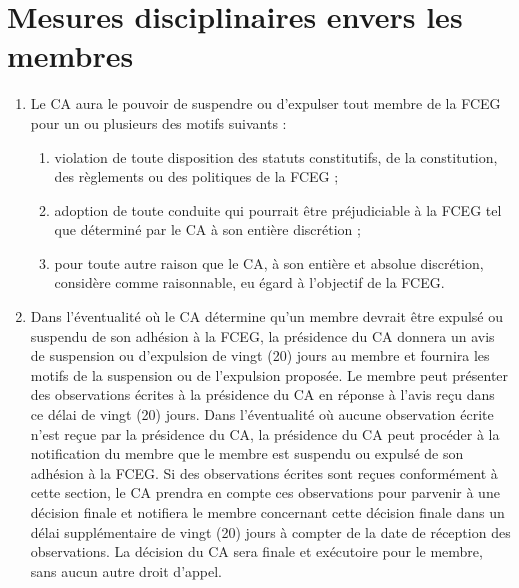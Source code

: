 \section{Mesures disciplinaires envers les membres}
\label{mesures-disciplinaires-envers-les-membres}

\begin{enumerate}
 \item Le CA aura le pouvoir de suspendre ou d'expulser tout membre de la FCEG pour un ou plusieurs des motifs suivants :
  \begin{enumerate}
   \item violation de toute disposition des statuts constitutifs, de la constitution, des règlements ou des politiques de la FCEG ;
   \item adoption de toute conduite qui pourrait être préjudiciable à la FCEG tel que déterminé par le CA à son entière discrétion ;
   \item pour toute autre raison que le CA, à son entière et absolue discrétion, considère comme raisonnable, eu égard à l'objectif de la FCEG.
  \end{enumerate}
 \item Dans l'éventualité où le CA détermine qu'un membre devrait être expulsé ou suspendu de son adhésion à la FCEG, la présidence du CA donnera un avis de suspension ou d'expulsion de vingt (20) jours au membre et fournira les motifs de la suspension ou de l'expulsion proposée. Le membre peut présenter des observations écrites à la présidence du CA en réponse à l'avis reçu dans ce délai de vingt (20) jours. Dans l'éventualité où aucune observation écrite n'est reçue par la présidence du CA, la présidence du CA peut procéder à la notification du membre que le membre est suspendu ou expulsé de son adhésion à la FCEG. Si des observations écrites sont reçues conformément à cette section, le CA prendra en compte ces observations pour parvenir à une décision finale et notifiera le membre concernant cette décision finale dans un délai supplémentaire de vingt (20) jours à compter de la date de réception des observations. La décision du CA sera finale et exécutoire pour le membre, sans aucun autre droit d'appel.
\end{enumerate}
